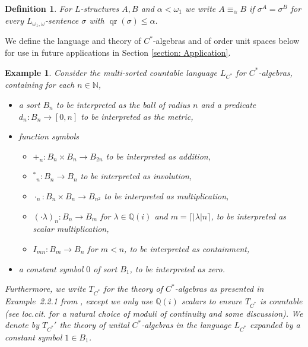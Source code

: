 \documentclass[12pt]{amsart}
\newtheorem{example}[theorem]{Example}
\newtheorem{definition}[theorem]{Definition}
\DeclareMathOperator{\qr}{qr}
\begin{document}
\begin{definition}\label{definition:alpha_elementary_equivalence}
    For $L$-structures $A,B$ and $\alpha<\omega_1$ we write $A\equiv_\alpha B$ if $\sigma^A=\sigma^B$ for every $L_{\omega_1, \omega}$-sentence $\sigma$ with $\qr(\sigma)\leq\alpha$.
\end{definition} 

We define the language and theory of $C^*$-algebras and of order unit spaces below for use in future applications in Section \ref{section: Application}.

\begin{example}\label{example:language of C*}
    Consider the multi-sorted countable language $L_{C^*}$ for $C^*$-algebras, containing for each $n\in\mathbb{N}$,
    \begin{itemize}
        \item a sort $B_n$ to be interpreted as the ball of radius $n$ and a predicate $d_n \colon B_n\to[0,n]$ to be interpreted as the metric,
        \item function symbols 
        \begin{itemize}
            \item $+_n \colon B_n\times B_n\to B_{2n}$ to be interpreted as addition, 
            \item ${^*}_n \colon B_n\to B_n$ to be interpreted as involution,
            \item $\cdot_n \colon B_n\times B_n\to B_{n^2}$ to be interpreted as multiplication,
            \item $(\cdot\lambda)_n \colon B_n\to B_m$ for $\lambda\in\mathbb Q(i)$ and $m={\lceil |\lambda| n \rceil}$, to be interpreted as scalar multiplication,
            \item $I_{mn} \colon B_m\to B_n$ for $m<n$, to be interpreted as containment,
        \end{itemize}
        \item a constant symbol $0$ of sort $B_1$, to be interpreted as zero.
    \end{itemize}  
    Furthermore, we write $T_{C^*}$ for the theory of $C^*$-algebras as presented in Example~2.2.1 from \cite{farah2021MTofC*}, except we only use $\mathbb{Q}(i)$ scalars to ensure $T_{C^*}$ is countable (see loc.cit. for a natural choice of moduli of continuity and some discussion). We denote by $T_{C^*}'$ the theory of unital $C^*$-algebras in the language $L_{C^*}$ expanded by a constant symbol $1 \in B_1$.
\end{example}
\end{document}
